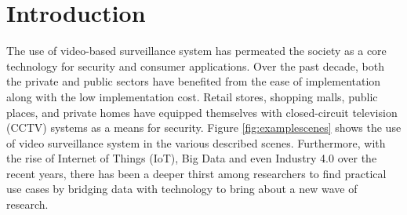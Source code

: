 \chapter{Introduction}
The use of video-based surveillance system has permeated the society as a core technology for security and consumer applications. Over the past decade, both the private and public sectors have benefited from the ease of implementation along with the low implementation cost.
Retail stores, shopping malls, public places, and private homes have equipped themselves with closed-circuit television (CCTV) systems as a means for security. Figure \ref{fig:examplescenes} shows the use of video surveillance system in the various described scenes.
Furthermore, with the rise of Internet of Things (IoT), Big Data and even Industry 4.0 over the recent years, there has been a deeper thirst among researchers to find practical use cases by bridging %
data with technology to bring about a new wave of research.

